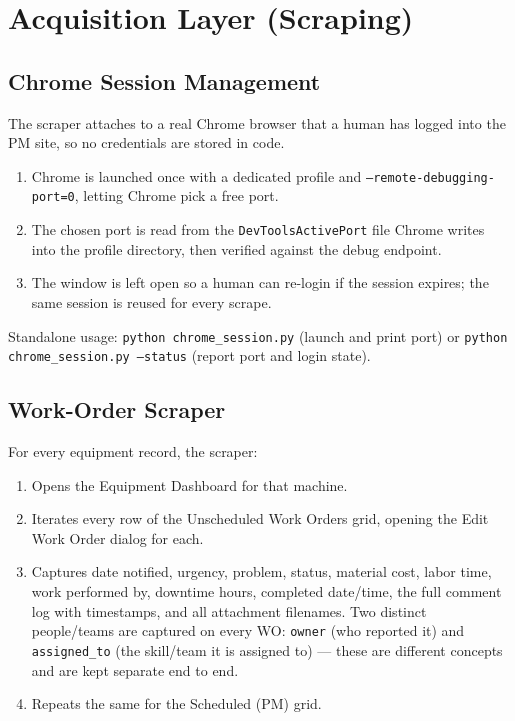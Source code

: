 \documentclass[11pt,a4paper]{article}
\newcommand{\code}[1]{\texttt{#1}}
\begin{document}
\section{Acquisition Layer (Scraping)}

\subsection{Chrome Session Management}
The scraper attaches to a real Chrome browser that a human has logged into
the PM site, so no credentials are stored in code.

\begin{enumerate}
    \item Chrome is launched once with a dedicated profile and
          \code{--remote-debugging-port=0}, letting Chrome pick a free port.
    \item The chosen port is read from the \code{DevToolsActivePort} file
          Chrome writes into the profile directory, then verified against
          the debug endpoint.
    \item The window is left open so a human can re-login if the session
          expires; the same session is reused for every scrape.
\end{enumerate}

Standalone usage: \code{python chrome\_session.py} (launch and print port)
or \code{python chrome\_session.py --status} (report port and login state).

\subsection{Work-Order Scraper}
For every equipment record, the scraper:
\begin{enumerate}
    \item Opens the Equipment Dashboard for that machine.
    \item Iterates every row of the Unscheduled Work Orders grid, opening
          the Edit Work Order dialog for each.
    \item Captures date notified, urgency, problem, status, material cost,
          labor time, work performed by, downtime hours, completed
          date/time, the full comment log with timestamps, and all
          attachment filenames. Two distinct people/teams are captured on
          every WO: \code{owner} (who reported it) and \code{assigned\_to}
          (the skill/team it is assigned to) --- these are different
          concepts and are kept separate end to end.
    \item Repeats the same for the Scheduled (PM) grid.
\end{enumerate}
\end{document}
